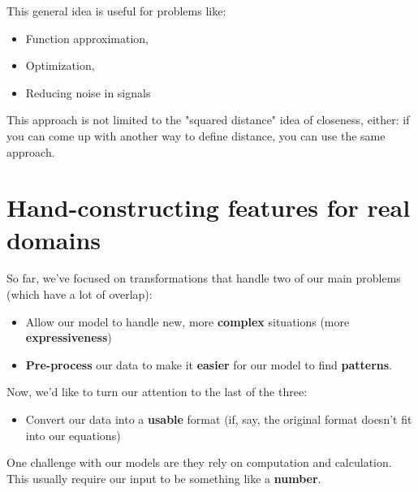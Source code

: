             This general idea is useful for problems like:
            \begin{itemize}
                \item Function approximation,
                \item Optimization,
                \item Reducing noise in signals
            \end{itemize}

            This approach is not limited to the "squared distance" idea of closeness, either: if you can come up with another way to define distance, you can use the same approach.

            
    \secdiv
    
            
    \pagebreak
    \section{Hand-constructing features for real domains }

        So far, we've focused on transformations that handle two of our main problems (which have a lot of overlap):

        \begin{itemize}
                \item Allow our model to handle new, more \textbf{complex} situations (more \textbf{expressiveness})

                \item \textbf{Pre-process} our data to make it \textbf{easier} for our model to find \textbf{patterns}.
                
            \end{itemize}

        Now, we'd like to turn our attention to the last of the three:

        \begin{itemize}
            \item Convert our data into a \textbf{usable} format (if, say, the original format doesn't fit into our equations)
        \end{itemize}

        One challenge with our models are they rely on computation and calculation. This usually require our input to be something like a \textbf{number}.

